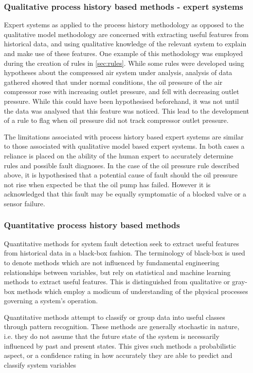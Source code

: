 \subsubsection{Qualitative process history based methods - expert systems}
\label{subsubsec:prochistexpert}
Expert systems as applied to the process history methodology as opposed to the qualitative model methodology are concerned with extracting useful features from historical data, and using qualitative knowledge of the relevant system to explain and make use of these features.
One example of this methodology was employed during the creation of rules in \autoref{sec:rules}. While some rules were developed using hypotheses about the compressed air system under analysis, analysis of data gathered showed that under normal conditions, the oil pressure of the air compressor rose with increasing outlet pressure, and fell with decreasing outlet pressure. While this could have been hypothesised beforehand, it was not until the data was analysed that this feature was noticed. This lead to the development of a rule to flag when oil pressure did not track compressor outlet pressure.

The limitations associated with process history based expert systems are similar to those associated with qualitative model based expert systems. In both cases a reliance is placed on the ability of the human expert to accurately determine rules and possible fault diagnoses. In the case of the oil pressure rule described above, it is hypothesised that a potential cause of fault should the oil pressure not rise when expected be that the oil pump has failed. However it is acknowledged that this fault may be equally symptomatic of a blocked valve or a sensor failure.

\subsubsection{Quantitative process history based methods}
Quantitative methods for system fault detection seek to extract useful features from historical data in a black-box fashion. The terminology of black-box is used to denote methods which are not influenced by fundamental engineering relationships between variables, but rely on statistical and machine learning methods to extract useful features. This is distinguished from qualitative or gray-box methods which employ a modicum of understanding of the physical processes governing a system’s operation.

Quantitative methods attempt to classify or group data into useful classes through pattern recognition. These methods are generally stochastic in nature, i.e. they do not assume that the future state of the system is necessarily influenced by past and present states. This gives such methods a probabilistic aspect, or a confidence rating in how accurately they are able to predict and classify system variables



